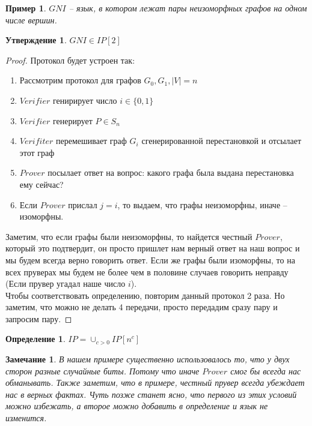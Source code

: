 \documentclass[12pt, letterpaper]{article}
\newtheorem{prop}{Утверждение}[section]
\newtheorem{defi}{Определение}[section]
\newtheorem{sample}{Пример}[section]
\newtheorem{note}{Замечание}[section]
\begin{document}
\begin{sample}
$GNI$ -- язык, в котором лежат пары неизоморфных графов на одном числе вершин.
\end{sample}
\begin{prop}
$GNI \in IP[2]$
\end{prop}
\begin{proof}
Протокол будет устроен так:
\begin{enumerate}
\item Рассмотрим протокол для графов $G_0, G_1, |V|=n$
\item $Verifier$ генирирует число $i \in \{0, 1\}$
\item $Verifier$ генерирует $P \in S_n$
\item $Verifiter$ перемешивает граф $G_i$ сгенерированной перестановкой и отсылает этот граф
\item $Prover$ посылает ответ на вопрос: какого графа была выдана перестановка ему сейчас?
\item Если $Prover$ прислал $j=i$, то выдаем, что графы неизоморфны, иначе -- изоморфны.
\end{enumerate}
Заметим, что если графы были неизоморфны, то найдется честный $Prover$, который это подтвердит, он просто пришлет нам верный ответ на наш вопрос и мы будем всегда верно говорить ответ. Если же графы были изоморфны, то на всех пруверах мы будем не более чем в половине случаев говорить неправду (Если прувер угадал наше число $i$). \\
Чтобы соответствовать определению, повторим данный протокол 2 раза. Но заметим, что можно не делать 4 передачи, просто передадим сразу пару и запросим пару. 
\end{proof}

\begin{defi}
$IP = \cup_{c>0} IP[n^c]$
\end{defi}

\begin{note}
В нашем примере существенно использовалось то, что у двух сторон разные случайные биты. Потому что иначе $Prover$ смог бы всегда нас обманывать. Также заметим, что в примере, честный прувер всегда убеждает нас в верных фактах. Чуть позже станет ясно, что первого из этих условий можно избежать, а второе можно добавить в определение и язык не изменится.
\end{note}
\end{document}

